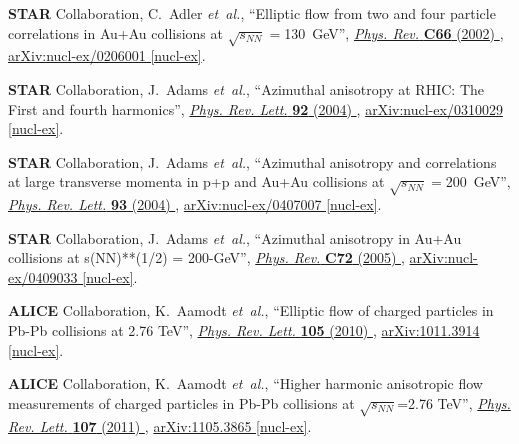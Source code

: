 \documentclass[ALICE,manyauthors]{cernphprep}
\begin{document}
\begin{thebibliography}{10}
{\bfseries STAR} Collaboration, C.~Adler {\em et~al.}, ``{Elliptic flow from
  two and four particle correlations in Au+Au collisions at $\sqrt{s_{NN}} =
  $130~GeV}'', \href{http://dx.doi.org/10.1103/PhysRevC.66.034904}{{\em Phys.
  Rev.} {\bfseries C66} (2002) },
\href{http://arxiv.org/abs/nucl-ex/0206001}{{\ttfamily arXiv:nucl-ex/0206001
  [nucl-ex]}}.

{\bfseries STAR} Collaboration, J.~Adams {\em et~al.}, ``{Azimuthal anisotropy
  at RHIC: The First and fourth harmonics}'',
  \href{http://dx.doi.org/10.1103/PhysRevLett.92.062301}{{\em Phys. Rev. Lett.}
  {\bfseries 92} (2004) },
\href{http://arxiv.org/abs/nucl-ex/0310029}{{\ttfamily arXiv:nucl-ex/0310029
  [nucl-ex]}}.

{\bfseries STAR} Collaboration, J.~Adams {\em et~al.}, ``{Azimuthal anisotropy
  and correlations at large transverse momenta in p+p and Au+Au collisions at
  $\sqrt{s_{NN}} = $200~GeV}'',
  \href{http://dx.doi.org/10.1103/PhysRevLett.93.252301}{{\em Phys. Rev. Lett.}
  {\bfseries 93} (2004) },
\href{http://arxiv.org/abs/nucl-ex/0407007}{{\ttfamily arXiv:nucl-ex/0407007
  [nucl-ex]}}.

{\bfseries STAR} Collaboration, J.~Adams {\em et~al.}, ``{Azimuthal anisotropy
  in Au+Au collisions at s(NN)**(1/2) = 200-GeV}'',
  \href{http://dx.doi.org/10.1103/PhysRevC.72.014904}{{\em Phys. Rev.}
  {\bfseries C72} (2005) },
\href{http://arxiv.org/abs/nucl-ex/0409033}{{\ttfamily arXiv:nucl-ex/0409033
  [nucl-ex]}}.

{\bfseries ALICE} Collaboration, K.~Aamodt {\em et~al.}, ``{Elliptic flow of
  charged particles in Pb-Pb collisions at 2.76 TeV}'',
  \href{http://dx.doi.org/10.1103/PhysRevLett.105.252302}{{\em Phys. Rev.
  Lett.} {\bfseries 105} (2010) },
\href{http://arxiv.org/abs/1011.3914}{{\ttfamily arXiv:1011.3914 [nucl-ex]}}.

{\bfseries ALICE} Collaboration, K.~Aamodt {\em et~al.}, ``{Higher harmonic
  anisotropic flow measurements of charged particles in Pb-Pb collisions at
  $\sqrt{s_{NN}}$=2.76 TeV}'',
  \href{http://dx.doi.org/10.1103/PhysRevLett.107.032301}{{\em Phys. Rev.
  Lett.} {\bfseries 107} (2011) },
\href{http://arxiv.org/abs/1105.3865}{{\ttfamily arXiv:1105.3865 [nucl-ex]}}.


\end{thebibliography}
\end{document}
